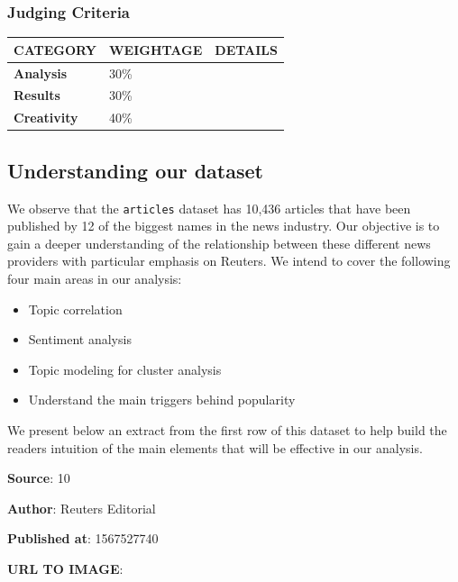 \documentclass[
]{article}
\providecommand{\tightlist}{%
  \setlength{\itemsep}{0pt}\setlength{\parskip}{0pt}}
\begin{document}
\hypertarget{judging-criteria}{%
\subsubsection{Judging Criteria}\label{judging-criteria}}

\begin{longtable}[]{@{}lll@{}}
\toprule
CATEGORY & WEIGHTAGE & DETAILS \\
\midrule
\endhead
\textbf{Analysis} & 30\% & \\
\textbf{Results} & 30\% & \\
\textbf{Creativity} & 40\% & \\
\bottomrule
\end{longtable}

\hypertarget{understanding-our-dataset}{%
\subsection{Understanding our dataset}\label{understanding-our-dataset}}

We observe that the \texttt{articles} dataset has 10,436 articles that
have been published by 12 of the biggest names in the news industry. Our
objective is to gain a deeper understanding of the relationship between
these different news providers with particular emphasis on Reuters. We
intend to cover the following four main areas in our analysis:

\begin{itemize}
\tightlist
\item
  Topic correlation
\item
  Sentiment analysis
\item
  Topic modeling for cluster analysis\\
\item
  Understand the main triggers behind popularity
\end{itemize}

We present below an extract from the first row of this dataset to help
build the readers intuition of the main elements that will be effective
in our analysis.

\textbf{Source}: 10

\textbf{Author}: Reuters Editorial

\textbf{Published at}: 1567527740

\textbf{URL TO IMAGE}:
\end{document}
